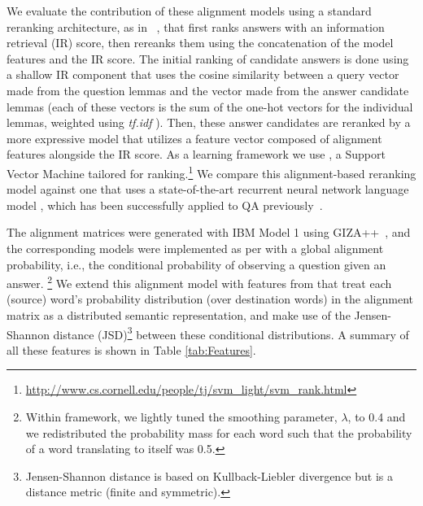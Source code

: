 We evaluate the contribution of these alignment models using a standard reranking architecture, as in ~\citet{jansen14}, that first ranks answers with an information retrieval (IR) score, then rereanks them using the concatenation of the model features and the IR score.
The initial ranking of candidate answers is done using a shallow IR component that uses the cosine similarity between a query vector made from the question lemmas and the vector made from the answer candidate lemmas (each of these vectors is the sum of the one-hot vectors for the individual lemmas, weighted using {\em tf.idf} \citep[Ch. 6,][]{manning08}).
Then, these answer candidates are reranked by a more expressive model that utilizes a feature vector composed of alignment features alongside the IR score.  As a learning framework we use \svmr , a Support Vector Machine tailored for ranking.\footnote{ \url{http://www.cs.cornell.edu/people/tj/svm_light/svm_rank.html}}
We compare this alignment-based reranking model against one that uses a state-of-the-art recurrent neural network language model \citep{mikolov10,mikolov13}, which has been successfully applied to QA previously~\citep[e.g.,][]{yih13}.


{}  The alignment matrices were generated with IBM Model 1 \citep{Brown:93} using GIZA++~\citep{och03}, and the corresponding models were implemented as per \citet{Surdeanu:11} with a global alignment probability, i.e., the conditional probability of observing a question given an answer.
\footnote{Within \citet{Surdeanu:11} framework, we lightly tuned the smoothing parameter, $\lambda$, to 0.4 and we redistributed the probability mass for each word such that the probability of a word translating to itself was 0.5.}  
We extend this alignment model with features from \citet{fried2015higher} that treat each (source) word's probability distribution (over destination words) in the alignment matrix as a distributed semantic representation, and make use of the Jensen-Shannon distance (JSD)\footnote{Jensen-Shannon distance is based on Kullback-Liebler divergence but is a distance metric (finite and symmetric).} between these conditional distributions.  A summary of all these features is shown in Table \ref{tab:Features}.%


